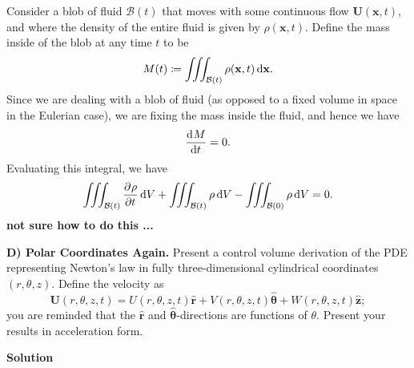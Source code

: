 \documentclass{article}
\def\*#1{\mathbf{#1}}
\newcommand{\B}{\mathcal{B}}
\newcommand{\rhat}{\mathbf{\hat{r}}}
\newcommand{\thetahat}{\boldsymbol{\hat{\theta}}}
\newcommand{\zhat}{\mathbf{\hat{z}}}
\begin{document}
Consider a blob of fluid $\B(t)$ that moves with some continuous flow
$\*U(\*x, t)$, and where the density of the entire fluid is given by
$\rho(\*x, t)$. Define the mass inside of the blob at any time $t$
to be
%
\begin{equation*}
    M(t) \coloneqq \iiint_{\B(t)} \rho(\*x, t) \dif \*x
    .
\end{equation*}
%
Since we are dealing with a blob of fluid (as opposed to a fixed volume
in space in the Eulerian case), we are fixing the mass inside the fluid,
and hence we have
%
\begin{equation*}
    \dod{M}{t} = 0
    .
\end{equation*}
%
Evaluating this integral, we have
%
\begin{equation*}
    \iiint_{\B(t)} \dpd{\rho}{t} \dif V
    + \iiint_{\B(t)} \rho \dif V
    - \iiint_{\B(0)} \rho \dif V
    = 0
    .
\end{equation*}
%
\textbf{not sure how to do this ...}

\newpage

\textbf{D) Polar Coordinates Again.} Present a control volume derivation
of the PDE representing Newton's law in fully three-dimensional cylindrical
coordinates $(r, \theta, z)$. Define the velocity as
%
\begin{equation*}
    \*U(r, \theta, z, t)
        = U(r, \theta, z, t) \rhat
          + V(r, \theta, z, t) \thetahat
          + W(r, \theta, z, t) \zhat
          ;
\end{equation*}
%
you are reminded that the $\rhat$ and $\thetahat$-directions are
functions of $\theta$. Present your results in acceleration form.

\textbf{Solution}
\end{document}
